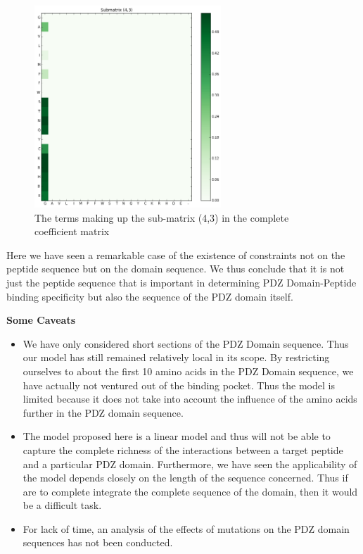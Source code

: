 \documentclass[a4paper, 12pt]{article}
\begin{document}
\begin{enumerate}
\begin{figure}[!h]
\centering
\label{submatrix_43}
\includegraphics[width=7cm]{Images/submatrix_43.png}
\caption{The terms making up the sub-matrix (4,3) in the complete coefficient matrix}
\end{figure}

Here we have seen a remarkable case of the existence of constraints not on the peptide sequence but on the domain sequence. We thus conclude that it is not just the peptide sequence that is important in determining PDZ Domain-Peptide binding specificity but also the sequence of the PDZ domain itself. 

\end{enumerate}

\textbf{Some Caveats}

\begin{itemize}
\item 
We have only considered short sections of the PDZ Domain sequence. Thus our model has still remained relatively local in its scope. By restricting ourselves to about the first 10 amino acids in the PDZ Domain sequence, we have actually not ventured out of the binding pocket. Thus the model is limited because it does not take into account the influence of the amino acids further in the PDZ domain sequence. 

\item 
The model proposed here is a linear model and thus will not be able to capture the complete richness of the interactions between a target peptide and a particular PDZ domain. Furthermore, we have seen the applicability of the model depends closely on the length of the sequence concerned. Thus if are to complete integrate the complete sequence of the domain, then it would be a difficult task. 

\item 
For lack of time, an analysis of the effects of mutations on the PDZ domain sequences has not been conducted. 
\end{itemize}
\end{document}
